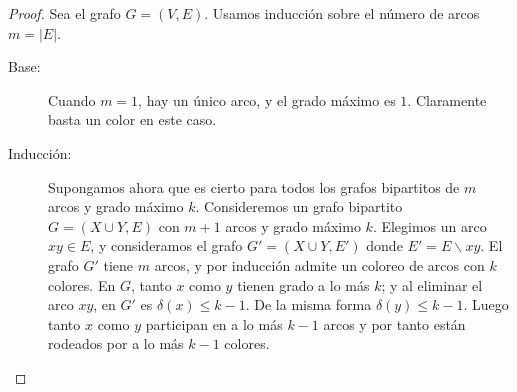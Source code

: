   \begin{proof}
    Sea el grafo \(G = (V, E)\).
    Usamos inducción
    sobre el número de arcos \(m = \lvert E \rvert\).%
    \begin{description}
    \item[Base:]
      Cuando \(m = 1\),
      hay un único arco,
      y el grado máximo es \(1\).
      Claramente basta un color en este caso.
    \item[Inducción:]
      Supongamos ahora que es cierto
      para todos los grafos bipartitos
      de \(m\) arcos y grado máximo \(k\).
      Consideremos un grafo bipartito \(G = (X \cup Y, E)\)
      con \(m + 1\) arcos
      y grado máximo \(k\).
      Elegimos un arco \(x y \in E\),
      y consideramos el grafo \(G' = (X \cup Y, E')\) donde
      \(E' = E \smallsetminus x y\).
      El grafo \(G'\) tiene \(m\) arcos,
      y por inducción admite un coloreo de arcos con \(k\) colores.
      En \(G\),
      tanto \(x\) como \(y\) tienen grado a lo más \(k\);
      y al eliminar el arco \(x y\),
      en \(G'\) es \(\delta(x) \le k - 1\).
      De la misma forma \(\delta(y) \le k - 1\).
      Luego tanto \(x\) como \(y\)
      participan en a lo más \(k - 1\) arcos
      y por tanto están rodeados por a lo más \(k - 1\) colores.


\end{description}
\end{proof}
